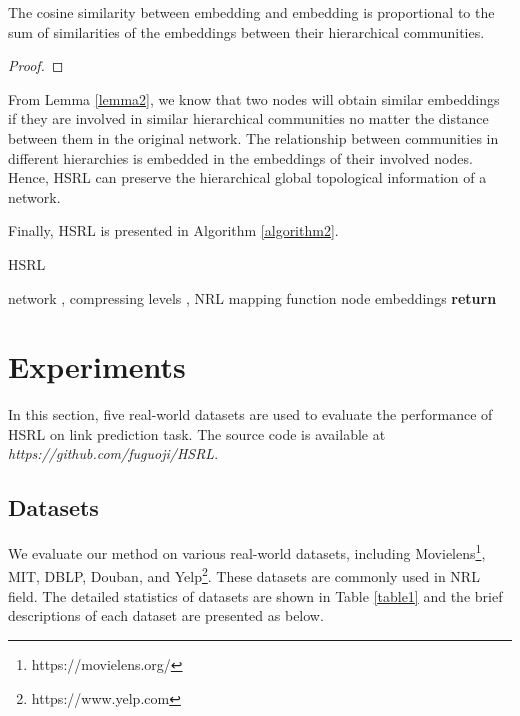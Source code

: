 \documentclass[conference]{IEEEtran}
\begin{document}
\begin{myprop}\label{lemma2}
    The cosine similarity between embedding  and embedding  is proportional to the sum of similarities of the embeddings between their hierarchical communities.
    
\end{myprop}

\begin{proof}
    
\end{proof}

From Lemma \ref{lemma2}, we know that two nodes will obtain similar embeddings if they are involved in similar hierarchical communities no matter the distance between them in the original network. The relationship between communities in different hierarchies is embedded in the embeddings of their involved nodes. Hence, HSRL can preserve the hierarchical global topological information of a network.

Finally, HSRL is presented in Algorithm \ref{algorithm2}.
\begin{algorithm}
	\renewcommand{\algorithmicrequire}{\textbf{Input:}}
	\renewcommand{\algorithmicensure}{\textbf{Output:}}
	\caption{HSRL}
	\label{algorithm2}
	\begin{algorithmic}[1]
		\REQUIRE network , compressing levels , NRL mapping function 
		\ENSURE node embeddings 
		\STATE 
		\FOR{}
		\STATE 
		\STATE 
		\ENDFOR
		\STATE 
		\STATE \textbf{return} 
	\end{algorithmic}  
\end{algorithm}

\section{Experiments}
In this section, five real-world datasets are used to evaluate the performance of HSRL on link prediction task. The source code is available at {\itshape https://github.com/fuguoji/HSRL}.

\subsection{Datasets}
We evaluate our method on various real-world datasets, including Movielens\footnote{https://movielens.org/}, MIT\cite{traud2012social}, DBLP\cite{sun2011pathsim}, Douban\cite{zheng2017recommendation}, and Yelp\footnote{https://www.yelp.com}. These datasets are commonly used in NRL field. The detailed statistics of datasets are shown in Table \ref{table1} and the brief descriptions of each dataset are presented as below.
\end{document}
